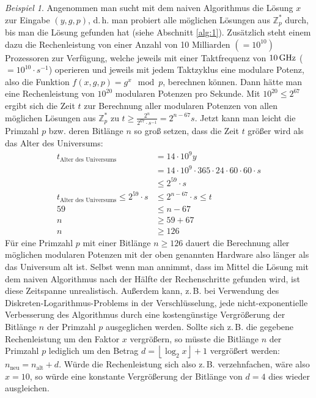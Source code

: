 \documentclass[
  a4paper,
  11pt,
]{scrartcl}
\theoremstyle{plain}
\theoremstyle{definition}
\theoremstyle{remark}
\newtheorem{beispiel}{Beispiel}
\newcommand{\Z}{\mathbb{Z}}
\begin{document}
\begin{beispiel}
  Angenommen man sucht mit dem naiven Algorithmus die Lösung $x$ zur Eingabe
  $(y, g, p)$, d.\,h. man probiert alle möglichen Lösungen aus $\Z_p^*$ durch,
  bis man die Lösung gefunden hat (siehe Abschnitt \ref{alg:1}). Zusätzlich steht einem dazu die
  Rechenleistung von einer Anzahl von 10 Milliarden $(=10^{10})$ Prozessoren zur Verfügung,
  welche jeweils mit einer Taktfrequenz von $10 \text{\,GHz}$ ($= 10^{10} \cdot s^{-1}$)
  operieren und jeweils mit jedem Taktzyklus eine modulare Potenz, also
  die Funktion $f(x, g, p) = g^x \mod p$, berechnen können. Dann hätte man eine
  Rechenleistung von $10^{20}$ modularen Potenzen pro Sekunde. Mit
  $10^{20} \leq 2^{67}$ ergibt sich die Zeit $t$ zur Berechnung aller modularen
  Potenzen von allen möglichen Lösungen aus $\Z_p^*$ zu
  $t \geq \frac{2^n}{2^{67}\cdot s^{-1}}=2^{n-67} s$. Jetzt kann man leicht die
  Primzahl $p$ bzw. deren Bitlänge $n$ so groß setzen, dass die Zeit $t$ größer
  wird als das Alter des Universums:
  \begin{align*}
    t_{\text{Alter des Universums}} & = 14 \cdot 10^9 y\\
    & = 14 \cdot 10^9 \cdot 365 \cdot 24 \cdot 60\cdot 60\cdot s\\
    & \leq 2^{59}\cdot s\\
    t_{\text{Alter des Universums}} \leq 2^{59}\cdot s & \leq 2^{n-67}\cdot s \leq t\\
    59 & \leq n-67\\
    n & \geq 59+67\\
    n & \geq 126
  \end{align*}
  Für eine Primzahl $p$ mit einer Bitlänge $n \geq 126$ dauert die Berechnung
  aller möglichen modularen Potenzen mit der oben genannten Hardware also länger
  als das Universum alt ist. Selbst wenn man annimmt, dass im Mittel die Lösung
  mit dem naiven Algorithmus nach der Hälfte der Rechenschritte gefunden wird,
  ist diese Zeitspanne unrealistisch. Außerdem kann, z.\,B. bei Verwendung des
  Diskreten-Logarithmus-Problems in der Verschlüsselung, jede
  nicht-exponentielle Verbesserung des Algorithmus durch eine kostengünstige
  Vergrößerung der Bitlänge $n$ der Primzahl $p$ ausgeglichen werden. Sollte
  sich z.\,B. die gegebene Rechenleistung um den Faktor $x$ vergrößern, so
  müsste die Bitlänge $n$ der Primzahl $p$ lediglich um den Betrag
  $d = \left\lfloor \log_2 x \right\rfloor + 1$ vergrößert werden:
  $n_{\text{neu}} = n_{\text{alt}} + d$. Würde die Rechenleistung sich also
  z.\,B. verzehnfachen, wäre also $x=10$, so würde eine konstante Vergrößerung
  der Bitlänge von $d=4$ dies wieder ausgleichen.
\end{beispiel}
\end{document}
